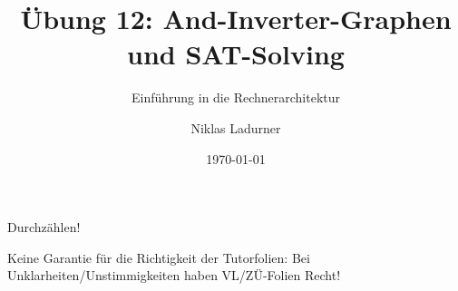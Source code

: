 \documentclass[
  german,            %
  aspectratio=169,    %
]{tumbeamer}
\title{Übung 12: And-Inverter-Graphen\\und SAT-Solving}
\subtitle{Einführung in die Rechnerarchitektur}
\author{Niklas Ladurner}
\institute{\theChairName\\\theDepartmentName\\\theUniversityName}
\date[\today]{\today}
\begin{document}
\maketitle

\begin{frame}[c]{}{}
  \begin{center}
    \LARGE  Durchzählen!
  \end{center}
\end{frame}

\begin{frame}[c]{}{}
  \begin{center}
    \LARGE  Keine Garantie für die Richtigkeit der Tutorfolien: Bei Unklarheiten/Unstimmigkeiten
    haben VL/ZÜ-Folien Recht!
  \end{center}
\end{frame}
\end{document}
